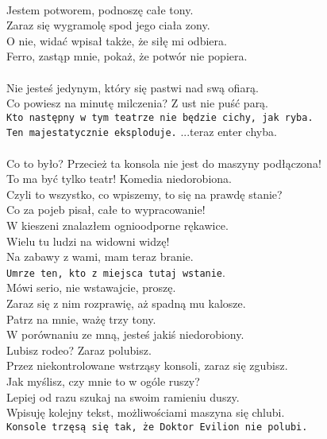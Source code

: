 \\

\charmik{}
Jestem potworem, podnoszę całe tony.\\
Zaraz się wygramolę spod jego ciała zony.\\
O nie, widać wpisał także, że siłę mi odbiera.\\
Ferro, zastąp mnie, pokaż, że potwór nie popiera.\\

\\

\charfer{}
Nie jesteś jedynym, który się pastwi nad swą ofiarą.\\
Co powiesz na minutę milczenia? Z ust nie puść parą.\\
\texttt{Kto następny w tym teatrze nie będzie cichy, jak ryba.\\
Ten majestatycznie eksploduje.} ...teraz enter chyba.\\

\\

\charfer{}
Co to było? Przecież ta konsola nie jest do maszyny podłączona!\\
To ma być tylko teatr! Komedia niedorobiona.\\
Czyli to wszystko, co wpiszemy, to się na prawdę stanie?\\
Co za pojeb pisał, całe to wypracowanie!\\

\chardok{}
W kieszeni znalazłem ognioodporne rękawice.\\
Wielu tu ludzi na widowni widzę!\\
Na zabawy z wami, mam teraz branie.\\
\texttt{Umrze ten, kto z miejsca tutaj wstanie}.\\

\charfer{}
Mówi serio, nie wstawajcie, proszę.\\
Zaraz się z nim rozprawię, aż spadną mu kalosze.\\
Patrz na mnie, ważę trzy tony.\\
W porównaniu ze mną, jesteś jakiś niedorobiony.\\
Lubisz rodeo? Zaraz polubisz.\\
Przez niekontrolowane wstrząsy konsoli, zaraz się zgubisz.\\
Jak myślisz, czy mnie to w ogóle ruszy?\\
Lepiej od razu szukaj na swoim ramieniu duszy.\\
Wpisuję kolejny tekst, możliwościami maszyna się chlubi.\\
\texttt{Konsole trzęsą się tak, że Doktor Evilion nie polubi.}\\

